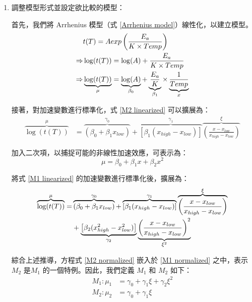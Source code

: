 \begin{enumerate}
\renewcommand{\labelenumi}{\Roman{enumi}.}

\item 調整模型形式並設定欲比較的模型：

首先，我們將 Arrhenius 模型（式 \eqref{Arrhenius model}）線性化，以建立模型。
\begin{align}
&t(T)=Aexp\left( \frac{E_a}{K \times Temp} \right)\notag \\ 
\Rightarrow&\log(t(T))=\log(A)+\frac{E_a}{K \times Temp}\notag \\ 
\Rightarrow&\underbrace{\log(t(T))}_{\mu}=\underbrace{\log(A)}_{\beta_0}+\underbrace{\frac{E_a}{K}}_{\beta_1} \times \underbrace{\frac{1}{Temp}}_x \label{M2 linearized}
\end{align}

接著，對加速變數進行標準化，式 \eqref{M2 linearized} 可以擴展為：
\begin{align}
\overbrace{\log(t(T))}^{\mu}&=\overbrace{(\beta_0+\beta_1 x_{low})}^{\gamma_0}+\overbrace{\left[\beta_1(x_{high}-x_{low})\right]}^{\gamma_1}\overbrace{\left( \frac{x-x_{low}}{x_{high}-x_{low}}\right)}^{\xi} \label{M2 normalized}
\end{align}

加入二次項，以捕捉可能的非線性加速效應，可表示為：
\begin{equation} \label{M1 linearized}
\mu =\beta_0+\beta_1x+\beta_2x^2
\end{equation}

將式 \eqref{M1 linearized} 的加速變數進行標準化後，擴展為：
\begin{align}
\overbrace{\log(t(T))}^{\mu}=&\overbrace{(\beta_0+\beta_1 x_{low})}^{\gamma_0}+\overbrace{\left[\beta_1(x_{high}-x_{low})\right]}^{\gamma_1}\overbrace{\left( \frac{x-x_{low}}{x_{high}-x_{low}}\right)}^{\xi} \notag \\
&+\underbrace{\left[\beta_2 (x_{high}^2-x_{low}^2) \right]}_{\gamma_2}\underbrace{\left( \frac{x-x_{low}}{x_{high}-x_{low}}\right)^2}_{\xi^2} \label{M1 normalized}
\end{align}

綜合上述推導，方程式 \eqref{M2 normalized} 嵌入於 \eqref{M1 normalized} 之中，表示 $M_2$ 是$M_1$ 的一個特例。因此，我們定義 $M_1$ 和 $M_2$ 如下：
\begin{align}
M_1:\mu_1&=\gamma_0+\gamma_1 \xi +\gamma_2 \xi^2   \label{Final M1 normalized} \\
M_2:\mu_2&=\gamma_0+\gamma_1 \xi   \label{Final M2 normalized}
\end{align}


\end{enumerate}
